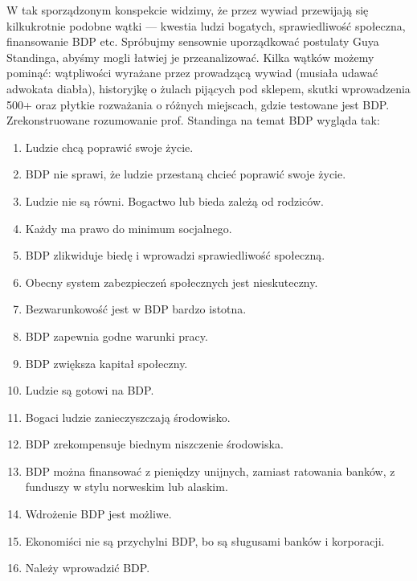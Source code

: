 \documentclass[11pt]{article}
\begin{document}
	\par W tak sporządzonym konspekcie widzimy, że przez wywiad przewijają się kilkukrotnie podobne wątki — kwestia ludzi bogatych, sprawiedliwość społeczna, finansowanie BDP etc. Spróbujmy sensownie uporządkować postulaty Guya Standinga, abyśmy mogli łatwiej je przeanalizować. Kilka wątków możemy pominąć: wątpliwości wyrażane przez prowadzącą wywiad (musiała udawać adwokata diabła), historyjkę o żulach pijących pod sklepem, skutki wprowadzenia 500+ oraz płytkie rozważania o różnych miejscach, gdzie testowane jest BDP. Zrekonstruowane rozumowanie prof. Standinga na temat BDP wygląda tak:
	
	\begin{enumerate}
		\item Ludzie chcą poprawić swoje życie.
		\item BDP nie sprawi, że ludzie przestaną chcieć poprawić swoje życie.
		\item Ludzie nie są równi. Bogactwo lub bieda zależą od rodziców.
		\item Każdy ma prawo do minimum socjalnego.
		\item BDP zlikwiduje biedę i wprowadzi sprawiedliwość społeczną.
		\item Obecny system zabezpieczeń społecznych jest nieskuteczny.
		\item Bezwarunkowość jest w BDP bardzo istotna.
		\item BDP zapewnia godne warunki pracy.
		\item BDP zwiększa kapitał społeczny.
		\item Ludzie są gotowi na BDP.
		\item Bogaci ludzie zanieczyszczają środowisko.
		\item BDP zrekompensuje biednym niszczenie środowiska.
		\item BDP można finansować z pieniędzy unijnych, zamiast ratowania banków, z funduszy w stylu norweskim lub alaskim.
		\item Wdrożenie BDP jest możliwe.
		\item Ekonomiści nie są przychylni BDP, bo są sługusami banków i korporacji.
		\item Należy wprowadzić BDP.
	\end{enumerate}
	
\end{document}
